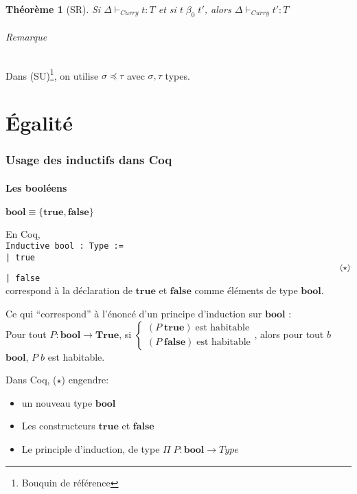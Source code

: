 \documentclass{article}
\newtheorem{thm}{Théorème}
\begin{document}
\begin{thm}[SR]
Si $\Delta\vdash_{Curry} t:T$ et si $t\; \beta_0 \; t'$, alors $\Delta \vdash_{Curry} t': T$
\end{thm}

\paragraph{Remarque} Dans (SU)\footnote{Bouquin de référence}, on utilise $\sigma \preceq \tau$ avec $\sigma,\tau$ types.

\part{Égalité}
\setcounter{section}{-1}
\section{Usage des inductifs dans Coq}
\subsection{Les booléens}
$\mathbf{bool}\equiv \{\mathbf{true}, \mathbf{false}\}$

En Coq, \\
\texttt{Inductive bool : Type :=\\
| true $\hspace{410px} (\star)$\\
| false}\\
correspond à la déclaration de $\mathbf{true}$ et $\mathbf{false}$ comme éléments de type $\mathbf{bool}$.


Ce qui ``correspond'' à l'énoncé d'un principe d'induction sur $\mathbf{bool}$ :\\
Pour tout $P : \mathbf{bool} \to \mathbf{True}$, si $\begin{cases}
(P\; \mathbf{true}) \;\text{est habitable}\\
(P\; \mathbf{false}) \;\text{est habitable}
\end{cases}$, alors pour tout $b$ $\mathbf{bool}$, $P\; b$ est habitable.
\bigskip

Dans Coq, ($\star$) engendre:
\begin{itemize}[noitemsep,label=-]
\item un nouveau type $\mathbf{bool}$
\item Les constructeurs $\mathbf{true}$ et $\mathbf{false}$
\item Le principle d'induction, de type $\Pi \; P : \mathbf{bool} \to Type$
\end{itemize}
\end{document}
